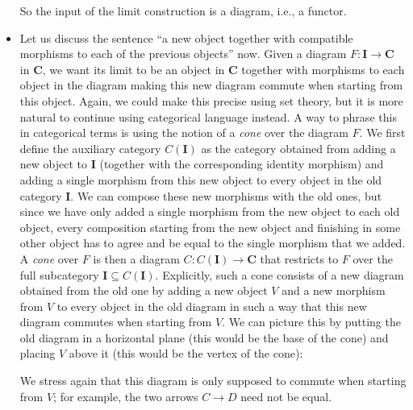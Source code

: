 \documentclass[12pt,reqno,a4paper]{amsart}
\theoremstyle{plain}
\theoremstyle{definition}
\theoremstyle{remark}
\begin{document}
\begin{itemize}
    So the input of the limit construction is a diagram, i.e., a functor.
  \item Let us discuss the sentence ``a new object together with compatible morphisms to each of the previous objects'' now.
    Given a diagram $F \colon \mathbf{I} \to \mathbf{C}$ in $\mathbf{C}$, we want its limit to be an object in $\mathbf{C}$ together with morphisms to  each object in the diagram making this new diagram commute when starting from this object.
    Again, we could make this precise using set theory, but it is more natural to continue using categorical language instead.
    A way to phrase this in categorical terms is using the notion of a \textit{cone} over the diagram $F$.
    We first define the auxiliary category $C(\mathbf{I})$ as the category obtained from adding a new object to $\mathbf{I}$ (together with the corresponding identity morphism) and adding a single morphism from this new object to every object in the old category $\mathbf{I}$.
    We can compose these new morphisms with the old ones, but since we have only added a single morphism from the new object to each old object, every composition starting from the new object and finishing in some other object has to agree and be equal to the single morphism that we added.
    A \textit{cone} over $F$ is then a diagram $C \colon C(\mathbf{I}) \to \mathbf{C}$ that restricts to $F$ over the full subcategory $\mathbf{I} \subseteq C(\mathbf{I})$.
    Explicitly, such a cone consists of a new diagram obtained from the old one by adding a new object $V$ and a new morphism from $V$ to every object in the old diagram in such a way that this new diagram commutes when starting from $V$.
    We can picture this by putting the old diagram in a horizontal plane (this would be the base of the cone) and placing $V$ above it (this would be the vertex of the cone):
    \begin{center}
    \end{center}
    We stress again that this diagram is only supposed to commute when starting from $V$; for example, the two arrows $C \to D$ need not be equal.
    

\end{itemize}
\end{document}
